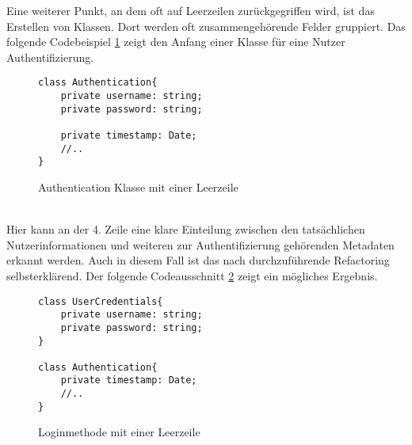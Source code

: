 \newpage
Eine weiterer Punkt, an dem oft auf Leerzeilen zurückgegriffen wird, ist das Erstellen von Klassen.
Dort werden oft zusammengehörende Felder gruppiert.
Das folgende Codebeispiel \ref{fig:LeerzeileFelder} zeigt den Anfang einer Klasse für eine Nutzer Authentifizierung. 
\begin{figure}[ht]
    \centering
        \begin{verbatim}
class Authentication{
    private username: string;
    private password: string;

    private timestamp: Date;
    //..
}
        \end{verbatim}
    \caption{Authentication Klasse mit einer Leerzeile}
    \label{fig:LeerzeileFelder}
\end{figure}\\
Hier kann an der 4. Zeile eine klare Einteilung zwischen den tatsächlichen Nutzerinformationen und weiteren zur Authentifizierung gehörenden Metadaten erkannt werden.
Auch in diesem Fall ist das nach \citep[S. 326]{fiveLines.2023} durchzuführende Refactoring selbsterklärend.
Der folgende Codeausschnitt \ref{fig:LeerzeileFelderErgebnis} zeigt ein mögliches Ergebnis.
\begin{figure}[ht]
    \centering
        \begin{verbatim}
class UserCredentials{
    private username: string;
    private password: string;
}

class Authentication{
    private timestamp: Date;
    //..
}
        \end{verbatim}
    \caption{Loginmethode mit einer Leerzeile}
    \label{fig:LeerzeileFelderErgebnis}
\end{figure}\\
\newpage
